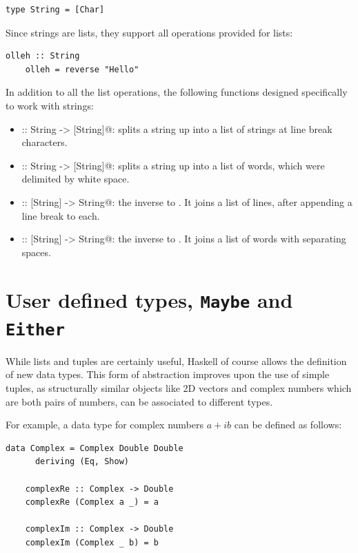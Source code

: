 \documentclass[UdineBachThesis,american,11pt]{PhdThesis}
\begin{document}
  \begin{lstlisting}[gobble=4,basicstyle=\ttfamily\small]
    type String = [Char]
  \end{lstlisting}

  Since strings are lists, they support all operations provided for lists:

  \begin{lstlisting}[gobble=4,basicstyle=\ttfamily\small]
    olleh :: String
    olleh = reverse "Hello"
  \end{lstlisting}

  In addition to all the list operations, the following functions designed
  specifically to work with strings:

  \begin{itemize}
    \item \lstinline@lines :: String -> [String]@: splits a string up into a
    list of strings at line break characters.

    \item \lstinline@words :: String -> [String]@: splits a string up into a
    list of words, which were delimited by white space.

    \item \lstinline@unlines :: [String] -> String@: the inverse to
    \lstinline@lines@. It joins a list of lines, after appending a line break to
    each.

    \item \lstinline@unwords :: [String] -> String@: the inverse to
    \lstinline@words@. It joins a list of words with separating spaces.
  \end{itemize}

  \section{User defined types, \texttt{Maybe} and \texttt{Either}}
  \label{section:user-defined-types}

  While lists and tuples are certainly useful, Haskell of course allows the
  definition of new data types. This form of abstraction improves upon the use
  of simple tuples, as structurally similar objects like 2D vectors and complex
  numbers which are both pairs of numbers, can be associated to different types.

  For example, a data type for complex numbers $a + i b$ can be defined as
  follows:

  \begin{lstlisting}[gobble=4,basicstyle=\ttfamily\small]
    data Complex = Complex Double Double
      deriving (Eq, Show)

    complexRe :: Complex -> Double
    complexRe (Complex a _) = a

    complexIm :: Complex -> Double
    complexIm (Complex _ b) = b
  \end{lstlisting}
\end{document}
